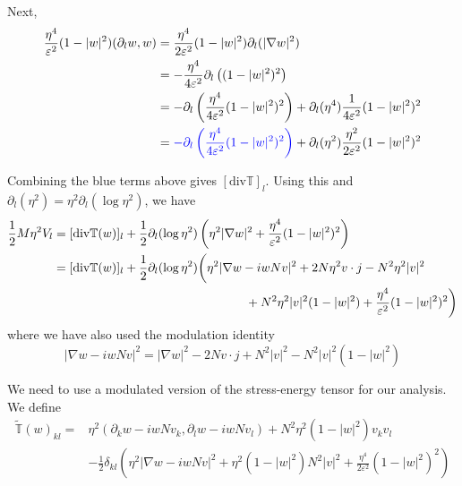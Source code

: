 \documentclass[a4paper]{article}
\renewcommand{\div}{\mathrm{div}}
\begin{document}
Next,
\begin{align}
  \frac{\eta^4}{\varepsilon^2} (1-|w|^2) (\partial_l w, w) &= \frac{\eta^4}{2 \varepsilon^2 } (1 - |w|^2) \partial_l ( |\nabla w|^2 ) \nonumber \\
  &= - \frac{\eta^4}{4 \varepsilon^2} \partial_l \left( (1-|w|^2)^2 \right) \nonumber \\
  &= - \partial_l \left( \frac{\eta^4}{4 \varepsilon^2} (1-|w|^2)^2 \right) + \partial_l (\eta^4) \frac{1}{4 \varepsilon^2} (1-|w|^2)^2 \nonumber \\
  &= { \color{blue} - \partial_l \left( \frac{\eta^4}{4 \varepsilon^2} (1-|w|^2)^2 \right) } + \partial_l (\eta^2) \frac{\eta^2}{2 \varepsilon^2}
  (1-|w|^2)^2
  \label{eq:V_l_term2}
\end{align}

Combining the blue terms above gives $[\div \mathbb{T}]_l$. Using this and $\partial_l (\eta^2) = \eta^2 \partial_l (\log \eta^2)$, we have
\begin{align}
  \frac{1}{2} M \eta^2 V_l &= [ \div \mathbb{T}(w) ]_l + \frac{1}{2} \partial_l (\log \eta^2) \left( \eta^2 |\nabla w|^2 + \frac{\eta^4}{\varepsilon^2}
  (1-|w|^2)^2 \right) \nonumber \\
  &= [ \div \mathbb{T}(w) ]_l + \frac{1}{2} \partial_l (\log \eta^2) \bigg( \eta^2 | \nabla w - i w N v |^2 + 2 N \eta^2 v \cdot j - N^2 \eta^2 |v|^2
  \nonumber \\
  &\hspace{5.5cm} + N^2 \eta^2 |v|^2 (1-|w|^2) + \frac{\eta^4}{\varepsilon^2} (1-|w|^2)^2 \bigg)
  \label{eq:V_l-final}
\end{align}
where we have also used the modulation identity
\begin{equation}
  | \nabla w - i w N v |^2 = |\nabla w|^2 - 2N v \cdot j + N^2 |v|^2 - N^2 |v|^2 (1-|w|^2)
  \label{eq:mod_identity}
\end{equation}

We need to use a modulated version of the stress-energy tensor for our analysis. We define
\begin{align}
  \tilde{\mathbb{T}}(w)_{kl} = &\eta^2 (\partial_k w - i w N v_k, \partial_l w - i w N v_l) + N^2 \eta^2 (1-|w|^2)v_k v_l \nonumber \\
  &- \frac{1}{2} \delta_{kl} \left( \eta^2 |\nabla w - i w N v|^2 + \eta^2 (1-|w|^2)N^2|v|^2 + \frac{\eta^4}{2 \varepsilon^2} (1-|w|^2)^2 \right)
  \label{def:mod_stress-energy}
\end{align}
\end{document}
